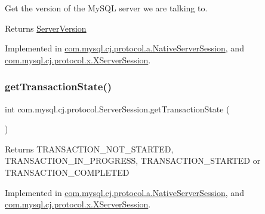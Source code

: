 Get the version of the My\+S\+QL server we are talking to.

\begin{DoxyReturn}{Returns}
\mbox{\hyperlink{classcom_1_1mysql_1_1cj_1_1_server_version}{Server\+Version}} 
\end{DoxyReturn}


Implemented in \mbox{\hyperlink{classcom_1_1mysql_1_1cj_1_1protocol_1_1a_1_1_native_server_session_a38d2e0173e10f1f3b55a04c34c9fa8e8}{com.\+mysql.\+cj.\+protocol.\+a.\+Native\+Server\+Session}}, and \mbox{\hyperlink{classcom_1_1mysql_1_1cj_1_1protocol_1_1x_1_1_x_server_session_a55b0588085914fbaa110c3e593efec8f}{com.\+mysql.\+cj.\+protocol.\+x.\+X\+Server\+Session}}.

\mbox{\label{interfacecom_1_1mysql_1_1cj_1_1protocol_1_1_server_session_a0af5a6df719817773de40fbc1aba021d}} 
\subsubsection{\texorpdfstring{get\+Transaction\+State()}{getTransactionState()}}
{\footnotesize\ttfamily int com.\+mysql.\+cj.\+protocol.\+Server\+Session.\+get\+Transaction\+State (\begin{DoxyParamCaption}{ }\end{DoxyParamCaption})}

\begin{DoxyReturn}{Returns}
T\+R\+A\+N\+S\+A\+C\+T\+I\+O\+N\+\_\+\+N\+O\+T\+\_\+\+S\+T\+A\+R\+T\+ED, T\+R\+A\+N\+S\+A\+C\+T\+I\+O\+N\+\_\+\+I\+N\+\_\+\+P\+R\+O\+G\+R\+E\+SS, T\+R\+A\+N\+S\+A\+C\+T\+I\+O\+N\+\_\+\+S\+T\+A\+R\+T\+ED or T\+R\+A\+N\+S\+A\+C\+T\+I\+O\+N\+\_\+\+C\+O\+M\+P\+L\+E\+T\+ED 
\end{DoxyReturn}


Implemented in \mbox{\hyperlink{classcom_1_1mysql_1_1cj_1_1protocol_1_1a_1_1_native_server_session_af4dfde9ca1e0cea7177b791ba4819f06}{com.\+mysql.\+cj.\+protocol.\+a.\+Native\+Server\+Session}}, and \mbox{\hyperlink{classcom_1_1mysql_1_1cj_1_1protocol_1_1x_1_1_x_server_session_ab49919f80a96ee3bd61cd00d94018dda}{com.\+mysql.\+cj.\+protocol.\+x.\+X\+Server\+Session}}.

